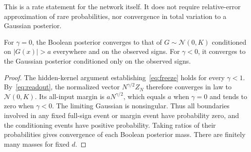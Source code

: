 This is a rate statement for the network itself. It does not require
relative-error approximation of rare probabilities, nor convergence
in total variation to a Gaussian posterior.

\begin{proposition}
\label{prop:gp-limits}
For $\gamma=0$, the Boolean posterior converges to that of
$G\sim\mathcal N(0,K)$ conditioned on $|G(x)|>a$ everywhere and on
the observed signs. For $\gamma<0$, it converges to the Gaussian
posterior conditioned only on the observed signs.
\end{proposition}
\begin{proof}
The hidden-kernel argument establishing~\eqref{eq:freeze} holds
for every $\gamma<1$. By~\eqref{eq:readout}, the normalized vector
$N^{\gamma/2}Z_N$ therefore converges in law to
$\mathcal N(0,K)$. Its all-input margin is $aN^{\gamma/2}$, which
equals $a$ when $\gamma=0$ and tends to zero when $\gamma<0$.
The limiting Gaussian is nonsingular. Thus all boundaries involved
in any fixed full-sign event or margin event have probability zero,
and the conditioning events have positive probability. Taking
ratios of their probabilities gives convergence of each Boolean
posterior mass. There are finitely many masses for fixed $d$.
\end{proof}

